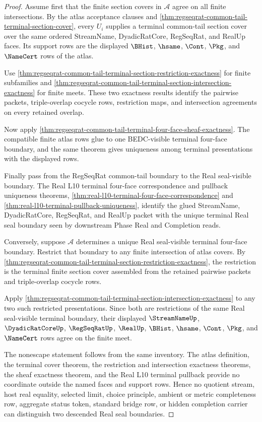 \begin{proof}
Assume first that the finite section covers in $\mathcal A$ agree on all finite intersections. By the atlas acceptance clauses and \autoref{thm:regseqrat-common-tail-terminal-section-cover}, every $U_i$ supplies a terminal common-tail section cover over the same ordered StreamName, DyadicRatCore, RegSeqRat, and RealUp faces. Its support rows are the displayed $\BHist$, $\hsame$, $\Cont$, $\Pkg$, and $\NameCert$ rows of the atlas.

Use \autoref{thm:regseqrat-common-tail-terminal-section-restriction-exactness} for finite subfamilies and \autoref{thm:regseqrat-common-tail-terminal-section-intersection-exactness} for finite meets. These two exactness results identify the pairwise packets, triple-overlap cocycle rows, restriction maps, and intersection agreements on every retained overlap.

Now apply \autoref{thm:regseqrat-common-tail-terminal-four-face-sheaf-exactness}. The compatible finite atlas rows glue to one BEDC-visible terminal four-face boundary, and the same theorem gives uniqueness among terminal presentations with the displayed rows.

Finally pass from the RegSeqRat common-tail boundary to the Real seal-visible boundary. The Real L10 terminal four-face correspondence and pullback uniqueness theorems, \autoref{thm:real-l10-terminal-four-face-correspondence} and \autoref{thm:real-l10-terminal-pullback-uniqueness}, identify the glued StreamName, DyadicRatCore, RegSeqRat, and RealUp packet with the unique terminal Real seal boundary seen by downstream Phase Real and Completion reads.

Conversely, suppose $\mathcal A$ determines a unique Real seal-visible terminal four-face boundary. Restrict that boundary to any finite intersection of atlas covers. By \autoref{thm:regseqrat-common-tail-terminal-section-restriction-exactness}, the restriction is the terminal finite section cover assembled from the retained pairwise packets and triple-overlap cocycle rows.

Apply \autoref{thm:regseqrat-common-tail-terminal-section-intersection-exactness} to any two such restricted presentations. Since both are restrictions of the same Real seal-visible terminal boundary, their displayed $\StreamNameUp$, $\DyadicRatCoreUp$, $\RegSeqRatUp$, $\RealUp$, $\BHist$, $\hsame$, $\Cont$, $\Pkg$, and $\NameCert$ rows agree on the finite meet.

The nonescape statement follows from the same inventory. The atlas definition, the terminal cover theorem, the restriction and intersection exactness theorems, the sheaf exactness theorem, and the Real L10 terminal pullback provide no coordinate outside the named faces and support rows. Hence no quotient stream, host real equality, selected limit, choice principle, ambient or metric completeness row, aggregate status token, standard bridge row, or hidden completion carrier can distinguish two descended Real seal boundaries.
\end{proof}

